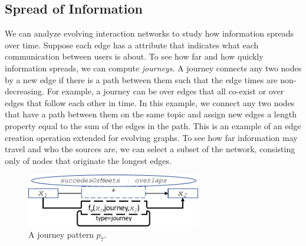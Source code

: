 \subsection{ Spread of Information} 

We can analyze evolving interaction networks to study how information
spreads over time.  Suppose each edge has a  attribute
that indicates what each communication between users is about.  To see
how far and how quickly information spreads, we can compute {\em
  journeys}.  A journey connects any two nodes by a new edge if there
is a path between them such that the edge times are non-decreasing.
For example, a journey can be over edges that all co-exist or over
edges that follow each other in time.  In this example, we connect any
two nodes that have a path between them on the same topic and assign
new edges a length property equal to the sum of the edges in the path.
This is an example of an edge creation operation extended for evolving
graphs.  To see how far information may travel and who the sources
are, we can select a subset of the network, consisting only of nodes
that originate the longest edges.

\begin{figure}
\centering
\includegraphics[width=3in]{figs/journeys.pdf}
\caption{A journey pattern $p_7$.}
\vspace{-0.2cm}
\label{fig:journeysp}
\vspace{-0.2cm}
\end{figure}

